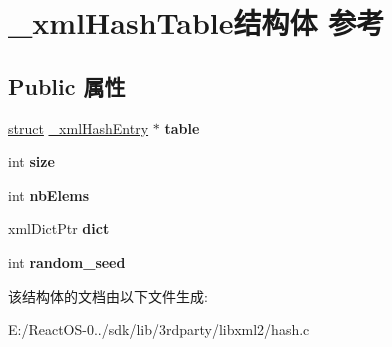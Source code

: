 \hypertarget{struct__xml_hash_table}{}\section{\+\_\+xml\+Hash\+Table结构体 参考}
\label{struct__xml_hash_table}
\subsection*{Public 属性}
\begin{DoxyCompactItemize}
\item 
\mbox{\label{struct__xml_hash_table_a36da1d191581b8afcd9d4dd4ad4faed0}} 
\hyperlink{interfacestruct}{struct} \hyperlink{struct__xml_hash_entry}{\+\_\+xml\+Hash\+Entry} $\ast$ {\bfseries table}
\item 
\mbox{\label{struct__xml_hash_table_af5dc56ca553b3e58479421549723c3f6}} 
int {\bfseries size}
\item 
\mbox{\label{struct__xml_hash_table_ab86af20391eb658fe03ed749500512f2}} 
int {\bfseries nb\+Elems}
\item 
\mbox{\label{struct__xml_hash_table_a7c6a48021fd6151daba2e5b0eb473ec8}} 
xml\+Dict\+Ptr {\bfseries dict}
\item 
\mbox{\label{struct__xml_hash_table_a6772ac0b3fe1ddf6a890d7a113ac6d8e}} 
int {\bfseries random\+\_\+seed}
\end{DoxyCompactItemize}


该结构体的文档由以下文件生成\+:\begin{DoxyCompactItemize}
\item 
E\+:/\+React\+O\+S-\/0../sdk/lib/3rdparty/libxml2/hash.\+c\end{DoxyCompactItemize}

